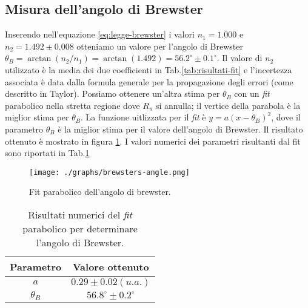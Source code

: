 \subsection{Misura dell'angolo di Brewster}\label{subsec:angolo-di-brewster}
  Inserendo nell'equazione \eqref{eq:legge-brewster} i valori $n_1 = 1.000$ e $n_2 = 1.492 \pm 0.008$
  otteniamo un valore per l'angolo di Brewster $\theta_B = \arctan{(n_2 / n_1)} = \arctan{(1.492)} = 56.2^\circ \pm 0.1^\circ$. Il valore di $n_2$ utilizzato è la media
  dei due coefficienti in Tab.\ref{tab:risultati-fit} e l'incertezza associata è data dalla formula generale per la
  propagazione degli errori (come descritto in Taylor\cite{taylor99}).
  Possiamo ottenere un'altra stima per $\theta_B$ con un \emph{fit} parabolico nella stretta regione
  dove $R_\pi$ si annulla; il vertice della parabola è la miglior stima per $\theta_B$.
  La funzione uitlizzata per il \emph{fit} è $y = a(x - \theta_B)^2$, dove il parametro $\theta_B$ è la
  miglior stima per il valore dell'angolo di Brewster.
  Il risultato ottenuto è mostrato in figura \ref{fig:brewsters-angle}. I valori numerici
  dei parametri risultanti dal fit sono riportati in Tab.\ref{tab:fit-brewster}
  \begin{figure}[h]
    \centering
    \caption{Fit parabolico dell'angolo di brewster.}
    \texttt{[image: ./graphs/brewsters-angle.png]}
    \label{fig:brewsters-angle}
  \end{figure}
  \begin{table}[ht]
    \centering
    \caption{
      Risultati numerici del \emph{fit} parabolico per determinare l'angolo di Brewster.
    }
    \begin{tabular}[t]{cc}
      \toprule
      Parametro &Valore ottenuto\\
      \midrule
      $a$ &$0.29 \pm 0.02 (u.a.)$ \\
      $\theta_B$ &$56.8^\circ \pm 0.2^\circ$ \\
      \bottomrule
    \end{tabular}\label{tab:fit-brewster}
  \end{table}
\endinput



